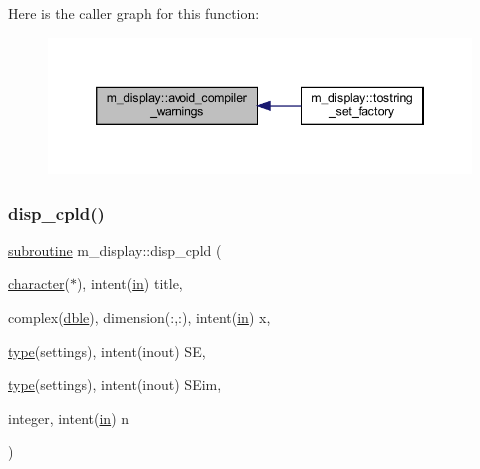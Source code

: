 Here is the caller graph for this function\+:
\nopagebreak
\begin{figure}[H]
\begin{center}
\leavevmode
\includegraphics[width=346pt]{namespacem__display_a6200cf732096469f40c38ec2baa6d811_icgraph}
\end{center}
\end{figure}
\mbox{\label{namespacem__display_a331e5caf7f78cff8f7e19145001bcdca}} 
\subsubsection{\texorpdfstring{disp\+\_\+cpld()}{disp\_cpld()}}
{\footnotesize\ttfamily \hyperlink{M__stopwatch_83_8txt_acfbcff50169d691ff02d4a123ed70482}{subroutine} m\+\_\+display\+::disp\+\_\+cpld (\begin{DoxyParamCaption}\item[{\hyperlink{option__stopwatch_83_8txt_abd4b21fbbd175834027b5224bfe97e66}{character}($\ast$), intent(\hyperlink{M__journal_83_8txt_afce72651d1eed785a2132bee863b2f38}{in})}]{title,  }\item[{complex(\hyperlink{namespacem__display_a46d90b75b6ccef7ccade133e5847e815}{dble}), dimension(\+:,\+:), intent(\hyperlink{M__journal_83_8txt_afce72651d1eed785a2132bee863b2f38}{in})}]{x,  }\item[{\hyperlink{stop__watch_83_8txt_a70f0ead91c32e25323c03265aa302c1c}{type}(settings), intent(inout)}]{SE,  }\item[{\hyperlink{stop__watch_83_8txt_a70f0ead91c32e25323c03265aa302c1c}{type}(settings), intent(inout)}]{S\+Eim,  }\item[{integer, intent(\hyperlink{M__journal_83_8txt_afce72651d1eed785a2132bee863b2f38}{in})}]{n }\end{DoxyParamCaption})\hspace{0.3cm}{\ttfamily [private]}}



